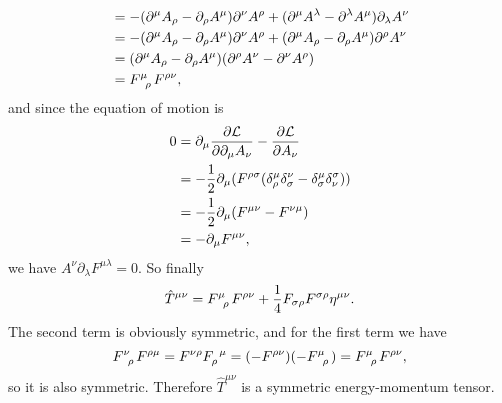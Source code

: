 \documentclass[hyperref, a4paper]{article}
\begin{document}
\begin{itemize}
\[\begin{aligned}
            &= - (\partial^\mu A_\rho - \partial_\rho A^\mu) \partial^\nu A^\rho + (\partial^\mu A^\lambda - \partial^\lambda A^\mu) \partial_\lambda A^\nu \\
            &= - (\partial^\mu A_\rho - \partial_\rho A^\mu) \partial^\nu A^\rho + (\partial^\mu A_\rho - \partial_\rho A^\mu) \partial^\rho A^\nu \\
            &= (\partial^\mu A_\rho - \partial_\rho A^\mu) (\partial^\rho A^\nu - \partial^\nu A^\rho) \\
            &= F\indices{^\mu_\rho} F^{\rho \nu},
        \end{aligned}
    \]
    and since the equation of motion is 
    \[
        \begin{aligned}
            0 &= \partial_\mu \pdv{\mathcal{L}}{\partial_\mu A_\nu} - \pdv{\mathcal{L}}{A_\nu} \\
            &= - \frac{1}{2} \partial_\mu (F^{\rho \sigma} (\delta^\mu_\rho \delta^\nu_\sigma - \delta^\mu_\sigma \delta^\sigma_\nu)) \\
            &= - \frac{1}{2} \partial_\mu (F^{\mu \nu} - F^{\nu \mu}) \\
            &= - \partial_\mu F^{\mu \nu},
        \end{aligned}
    \]
    we have $A^\nu \partial_\lambda F^{\mu \lambda} = 0$.
    So finally 
    \begin{equation}
        \hat{T}^{\mu \nu} = F\indices{^\mu_\rho} F^{\rho \nu} + \frac{1}{4} F_{\sigma \rho} F^{\sigma \rho} \eta^{\mu \nu}.
    \end{equation}
    The second term is obviously symmetric, and for the first term we have
    \[
        F\indices{^\nu_\rho} F^{\rho \mu} = F^{\nu \rho} F\indices{_\rho^\mu} = (- F^{\rho \nu}) (- F\indices{^\mu_\rho}) = F\indices{^\mu_\rho} F^{\rho \nu},
    \]
    so it is also symmetric. 
    Therefore $\hat{T}^{\mu \nu}$ is a symmetric energy-momentum tensor.


\end{itemize}
\end{document}
